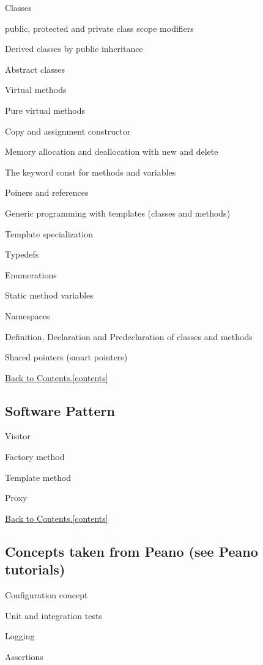 \documentclass[11pt, oneside]{scrartcl}
\newcommand{\backtocontents}{\hyperref[contents]{Back to Contents.\ref*{contents}}}
\begin{document}
\begin{itemize*}
\item Classes
\item public, protected and private class scope modifiers
\item Derived classes by public inheritance
\item Abstract classes
\item Virtual methods
\item Pure virtual methods
\item Copy and assignment constructor
\item Memory allocation and deallocation with new and delete
\item The keyword const for methods and variables
\item Poiners and references
\item Generic programming with templates (classes and methods)
\item Template specialization
\item Typedefs
\item Enumerations
\item Static method variables
\item Namespaces
\item Definition, Declaration and Predeclaration of classes and methods
\item Shared pointers (smart pointers)
\end{itemize*}

\backtocontents
 
\subsection{Software Pattern}

\begin{itemize*}
\item Visitor
\item Factory method
\item Template method
\item Proxy
\end{itemize*}

\backtocontents
 
\subsection{Concepts taken from Peano (see Peano tutorials)}
 
\begin{itemize*}
\item Configuration concept
\item Unit and integration tests
\item Logging
\item Assertions
\end{itemize*}
\end{document}
